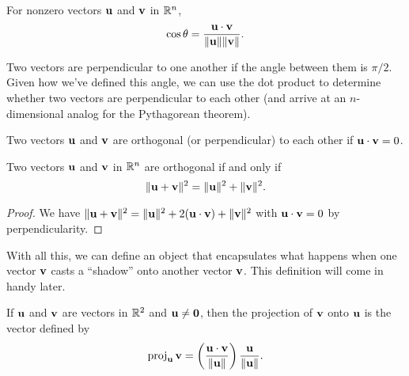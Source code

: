 \documentclass[../m073main.tex]{subfiles}
\begin{document}
\begin{definition}[Angle]
	For nonzero vectors $\mathbf{u}$ and $\mathbf{v}$ in $\mathbb{R}^n$,
	\[ \cos \theta = \frac{\mathbf{u} \cdot \mathbf{v}}{\|\mathbf{u}\| \|\mathbf{v}\|}. \]
\end{definition}

Two vectors are perpendicular to one another if the angle between them is $\pi / 2$.
Given how we've defined this angle, we can use the dot product to determine whether two vectors are perpendicular to each other (and arrive at an $n$-dimensional analog for the Pythagorean theorem).

\begin{definition}[Orthogonality]
	Two vectors $\mathbf{u}$ and $\mathbf{v}$ are orthogonal (or perpendicular) to each other if $\mathbf{u} \cdot \mathbf{v} = 0$.
\end{definition}

\begin{theorem}
	Two vectors $\mathbf{u}$ and $\mathbf{v}$ in $\mathbb{R}^n$ are orthogonal if and only if
	\[ \|\mathbf{u} + \mathbf{v}\|^2 = \|\mathbf{u}\|^2 + \|\mathbf{v}\|^2. \]
\end{theorem}

\begin{proof}
	We have $\|\mathbf{u} + \mathbf{v}\|^2 = \| \mathbf{u} \|^2 + 2 (\mathbf{u} \cdot \mathbf{v}) + \| \mathbf{v} \|^2$ with $\mathbf{u} \cdot \mathbf{v} = 0$ by perpendicularity.
\end{proof}

With all this, we can define an object that encapsulates what happens when one vector $\mathbf{v}$ casts a ``shadow'' onto another vector $\mathbf{v}$.
This definition will come in handy later.

\begin{definition}
	If $\mathbf{u}$ and $\mathbf{v}$ are vectors in $\mathbb{R}^2$ and $\mathbf{u} \neq \mathbf{0}$, then the projection of $\mathbf{v}$ onto $\mathbf{u}$ is the vector defined by
	\[ \operatorname{proj}_{\mathbf{u}} \mathbf{v} = \left( \frac{\mathbf{u} \cdot \mathbf{v}}{\|\mathbf{u}\|} \right) \frac{\mathbf{u}}{\|\mathbf{u}\|}. \]
\end{definition}
\end{document}
